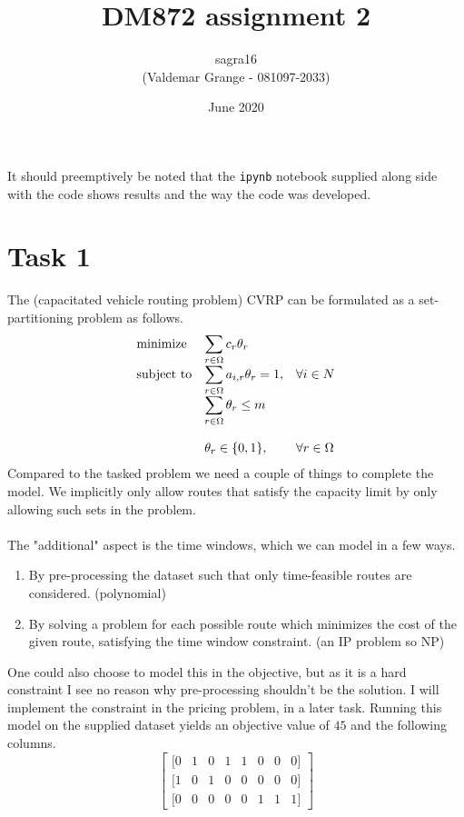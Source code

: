 \documentclass{article}
\title{DM872 assignment 2}
\author{sagra16 \\(Valdemar Grange - 081097-2033) }
\date{June 2020}
\begin{document}
    \maketitle
    It should preemptively be noted that the \texttt{ipynb} notebook supplied along side with the code shows results and the way the code was developed.
    
    \clearpage

    \section{Task 1}
    The (capacitated vehicle routing problem) CVRP can be formulated as a set-partitioning problem as follows.
    \begin{equation*}
        \begin{array}{ll@{}ll}
            \text{minimize}  & \displaystyle\sum_{r \in \Omega} c_r \theta_r& &\\
            \text{subject to}& \displaystyle\sum_{r \in \Omega} a_{i, r} \theta_r = 1 ,&   &\forall i \in N\\
                             & \displaystyle\sum_{r \in \Omega} \theta_r \leq m &&\\\\
                             & \displaystyle \theta_r  \in \{0,1\},  && \forall r \in \Omega
        \end{array}
    \end{equation*}
    Compared to the tasked problem we need a couple of things to complete the model.
    We implicitly only allow routes that satisfy the capacity limit by only allowing such sets in the problem.\\\\
    The "additional" aspect is the time windows, which we can model in a few ways.
    \begin{enumerate}
        \item By pre-processing the dataset such that only time-feasible routes are considered. (polynomial)
        \item By solving a problem for each possible route which minimizes the cost of the given route, satisfying the time window constraint. (an IP problem so NP)
    \end{enumerate}
    One could also choose to model this in the objective, but as it is a hard constraint I see no reason why pre-processing shouldn't be the solution.
    I will implement the constraint in the pricing problem, in a later task.
    Running this model on the supplied dataset yields an objective value of $45$ and the following columns.
    \[
        \begin{bmatrix}
            [0 & 1 & 0 & 1 & 1 & 0 & 0 & 0]\\
            [1 & 0 & 1 & 0 & 0 & 0 & 0 & 0]\\
            [0 & 0 & 0 & 0 & 0 & 1 & 1 & 1]
        \end{bmatrix}
    \]
\end{document}
